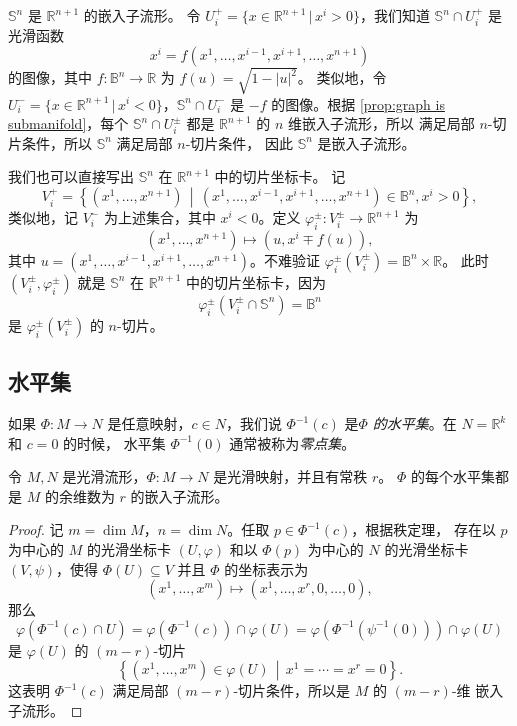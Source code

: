 \documentclass[fontset=none]{Notes}
\begin{document}
\begin{example}[球面作为子流形]
  $\mathbb{S}^n$ 是 $\mathbb{R}^{n+1}$ 的嵌入子流形。
  令 $U_i^+=\{x\in\mathbb{R}^{n+1}\,|\, x^i>0\}$，我们知道 $\mathbb{S}^n\cap U_i^+$
  是光滑函数
  \[
    x^i=f\left(x^1,\dots,x^{i-1},x^{i+1},\dots,x^{n+1}\right)  
  \]
  的图像，其中 $f:\mathbb{B}^n\to\mathbb{R}$ 为 $f(u)=\sqrt{1-|u|^2}$。
  类似地，令 $U_i^-=\{x\in\mathbb{R}^{n+1}\,|\, x^i<0\}$，$\mathbb{S}^n\cap U_i^-$
  是 $-f$ 的图像。根据 \autoref{prop:graph is submanifold}，每个
  $\mathbb{S}^n\cap U_i^\pm$ 都是 $\mathbb{R}^{n+1}$ 的 $n$ 维嵌入子流形，所以
  满足局部 $n$-切片条件，所以 $\mathbb{S}^n$ 满足局部 $n$-切片条件，
  因此 $\mathbb{S}^n$ 是嵌入子流形。

  我们也可以直接写出 $\mathbb{S}^n$ 在 $\mathbb{R}^{n+1}$ 中的切片坐标卡。
  记
  \[
    V_i^+=\left\{\left(x^1,\dots,x^{n+1}\right)\,\middle|\,
    \left(x^1,\dots,x^{i-1},x^{i+1},\dots,x^{n+1}\right)\in\mathbb{B}^n,x^i>0\right\} , 
  \]
  类似地，记 $V_i^-$ 为上述集合，其中 $x^i<0$。定义
  $\varphi_i^\pm:V_i^\pm\to\mathbb{R}^{n+1}$ 为
  \[
    \left(x^1,\dots,x^{n+1}\right)\mapsto\left(
      u,x^i\mp f(u)
    \right)  ,
  \]
  其中 $u=\left(x^1,\dots,x^{i-1},x^{i+1},\dots,x^{n+1}\right)$。不难验证
  $\varphi_i^\pm\left(V_i^\pm\right)=\mathbb{B}^{n}\times\mathbb{R}$。
  此时 $\left(V_i^\pm,\varphi_i^\pm\right)$ 就是 $\mathbb{S}^n$ 在 $\mathbb{R}^{n+1}$
  中的切片坐标卡，因为
  \[
    \varphi_i^\pm\left(V_i^\pm\cap\mathbb{S}^n\right)=\mathbb{B}^n
  \]
  是 $\varphi_i^\pm\left(V_i^\pm\right)$ 的 $n$-切片。
\end{example}


\subsection{水平集}

如果 $\varPhi:M\to N$ 是任意映射，$c\in N$，我们说 $\varPhi^{-1}(c)$
是\emph{$\varPhi$ 的水平集}。在 $N=\mathbb{R}^k$ 和 $c=0$ 的时候，
水平集 $\varPhi^{-1}(0)$ 通常被称为\emph{零点集}。

\begin{theorem}[常秩水平集定理]
  令 $M,N$ 是光滑流形，$\varPhi:M\to N$ 是光滑映射，并且有常秩 $r$。
  $\varPhi$ 的每个水平集都是 $M$ 的余维数为 $r$ 的嵌入子流形。
\end{theorem}
\begin{proof}
  记 $m=\dim M$，$n=\dim N$。任取 $p\in \varPhi^{-1}(c)$，根据秩定理，
  存在以 $p$ 为中心的 $M$ 的光滑坐标卡 $(U,\varphi)$ 和以 $\varPhi(p)$
  为中心的 $N$ 的光滑坐标卡 $(V,\psi)$，使得 $\varPhi(U)\subseteq V$
  并且 $\varPhi$ 的坐标表示为
  \[
    \left(x^1,\dots,x^m\right)\mapsto\left(x^1,\dots,x^r,0,\dots,0\right),
  \]
  那么 
  \[ 
    \varphi\left(\varPhi^{-1}(c)\cap U\right)=
    \varphi\left(\varPhi^{-1}(c)\right)\cap\varphi(U)=
    \varphi\left(\varPhi^{-1}\left(\psi^{-1}(0)\right)\right)\cap\varphi(U)
  \]
  是 $\varphi(U)$ 的 $(m-r)$-切片
  \[
    \left\{\left(x^1,\dots,x^m\right)\in\varphi(U)\,\middle|\, x^1=\cdots=x^r=0\right\}  .
  \]
  这表明 $\varPhi^{-1}(c)$ 满足局部 $(m-r)$-切片条件，所以是 $M$ 的 $(m-r)$-维
  嵌入子流形。
\end{proof}
\end{document}
